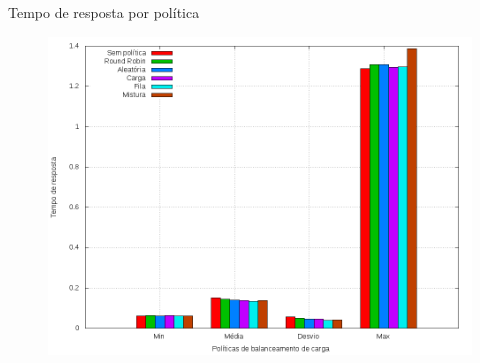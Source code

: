\begin{frame}{Tempo de resposta por política}
    \begin{figure}[htb!]
        \centering
        \includegraphics[scale=.35]{images/balancer-http-times}
    \end{figure}
\end{frame}

